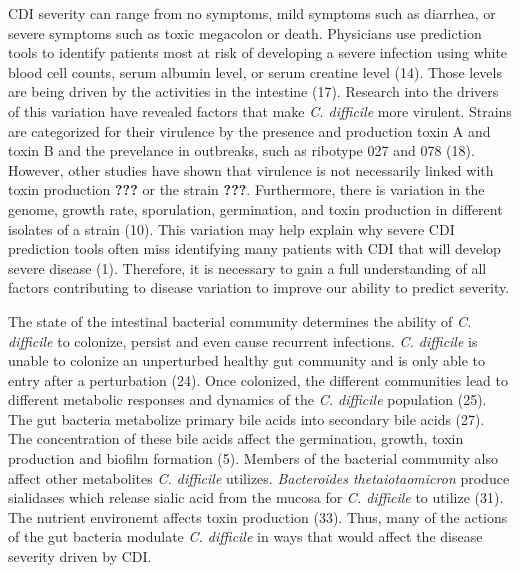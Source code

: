 \documentclass[
  12pt,
]{article}
\begin{document}
CDI severity can range from no symptoms, mild symptoms such as diarrhea,
or severe symptoms such as toxic megacolon or death. Physicians use
prediction tools to identify patients most at risk of developing a
severe infection using white blood cell counts, serum albumin level, or
serum creatine level (14). Those levels are being driven by the
activities in the intestine (17). Research into the drivers of this
variation have revealed factors that make \emph{C. difficile} more
virulent. Strains are categorized for their virulence by the presence
and production toxin A and toxin B and the prevelance in outbreaks, such
as ribotype 027 and 078 (18). However, other studies have shown that
virulence is not necessarily linked with toxin production
\textbf{\textbf{???}} or the strain \textbf{\textbf{???}}. Furthermore,
there is variation in the genome, growth rate, sporulation, germination,
and toxin production in different isolates of a strain (10). This
variation may help explain why severe CDI prediction tools often miss
identifying many patients with CDI that will develop severe disease (1).
Therefore, it is necessary to gain a full understanding of all factors
contributing to disease variation to improve our ability to predict
severity.

The state of the intestinal bacterial community determines the ability
of \emph{C. difficile} to colonize, persist and even cause recurrent
infections. \emph{C. difficile} is unable to colonize an unperturbed
healthy gut community and is only able to entry after a perturbation
(24). Once colonized, the different communities lead to different
metabolic responses and dynamics of the \emph{C. difficile} population
(25). The gut bacteria metabolize primary bile acids into secondary bile
acids (27). The concentration of these bile acids affect the
germination, growth, toxin production and biofilm formation (5). Members
of the bacterial community also affect other metabolites \emph{C.
difficile} utilizes. \emph{Bacteroides thetaiotaomicron} produce
sialidases which release sialic acid from the mucosa for \emph{C.
difficile} to utilize (31). The nutrient environemt affects toxin
production (33). Thus, many of the actions of the gut bacteria modulate
\emph{C. difficile} in ways that would affect the disease severity
driven by CDI.
\end{document}
